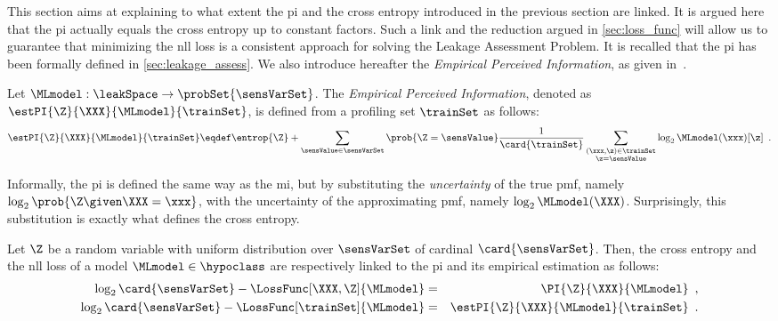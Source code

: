 This section aims at explaining to what extent the \gls{pi} and the cross entropy introduced in the previous section are linked. 
It is argued here that the \gls{pi} actually equals the cross entropy up to constant factors.
Such a link and the reduction argued in \autoref{sec:loss_func} will allow us to guarantee that minimizing the \gls{nll} loss is a consistent approach for solving the 
Leakage Assessment Problem.
It is recalled that the \gls{pi} has been formally defined in \autoref{sec:leakage_assess}.
We also introduce hereafter the \emph{Empirical Perceived Information}, as given in~\cite{bronchain_leakage_2019}.
\begin{definition}
    Let \(\MLmodel: \leakSpace \rightarrow \probSet{\sensVarSet}\).
    The \emph{Empirical Perceived Information}, denoted as \(\estPI{\Z}{\XXX}{\MLmodel}{\trainSet}\), is defined from a profiling set \(\trainSet\) as follows:
    \begin{equation}
        \estPI{\Z}{\XXX}{\MLmodel}{\trainSet} \eqdef
        \entrop{\Z} + \sum_{\sensValue \in \sensVarSet} 
        \prob{\Z = \sensValue} \frac{1}{\card{\trainSet}}
        \sum_{\substack{(\xxx, \z) \in \trainSet \\ \z = \sensValue}}
        \log_2 \MLmodel(\xxx)[\z] \enspace .
    \end{equation}
    \label{def:ePI}
\end{definition}
Informally, the \gls{pi} is defined the same way as the \gls{mi}, but by substituting the \emph{uncertainty} of the true \gls{pmf}, namely \(\log_2 \prob{\Z \given \XXX=\xxx}\), with the uncertainty of the approximating \gls{pmf}, namely \(\log_2 \MLmodel(\XXX)\). 
Surprisingly, this substitution is exactly what defines the cross entropy. 
\begin{proposition}
    \label{prop:PI_eq_gen_loss}
    Let \(\Z\) be a random variable with uniform distribution over \(\sensVarSet\) of cardinal \(\card{\sensVarSet}\).
    Then, the cross entropy and the \gls{nll} loss of a model \(\MLmodel \in \hypoclass\) are respectively linked to the \gls{pi} and its empirical estimation as follows:
    \begin{eqnarray}
        \label{eq:PI_eq_gen_loss}
        \log_2{\card{\sensVarSet}} - \LossFunc[\XXX, \Z]{\MLmodel} & = & 
        \PI{\Z}{\XXX}{\MLmodel} \enspace , \\
        \label{eq:ePI_eq_NLL_loss}
        \log_2{\card{\sensVarSet}} - \LossFunc[\trainSet]{\MLmodel} & = & 
        \estPI{\Z}{\XXX}{\MLmodel}{\trainSet} \enspace .
    \end{eqnarray}
\end{proposition}
